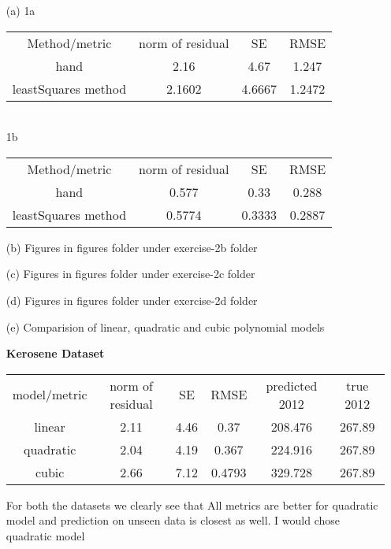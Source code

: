 \documentclass[unicode,11pt,a4paper,oneside,numbers=endperiod,openany]{scrartcl}
\begin{document}
\begin{itemize}
	\item [(a)] 
	{1a}
	\begin{center}
        \begin{tabular}{ c c c c}
         Method/metric & norm of residual & SE & RMSE\\ 
         hand & 2.16 & 4.67 & 1.247\\ 
         leastSquares method & 2.1602 & 4.6667 & 1.2472\\  
        \end{tabular}
    \end{center}
    \\
    {1b}
	\begin{center}
        \begin{tabular}{ c c c c}
         Method/metric & norm of residual & SE & RMSE\\ 
         hand & 0.577 & 0.33 & 0.288\\ 
         leastSquares method & 0.5774 & 0.3333 & 0.2887\\  
        \end{tabular}
    \end{center}
	\item [(b)] Figures in figures folder under exercise-2b folder
	\item [(c)] Figures in figures folder under exercise-2c folder
	\item [(d)] Figures in figures folder under exercise-2d folder
	\item [(e)] Comparision of linear, quadratic and cubic polynomial models
	
	\begin{center}
    {\bf{Kerosene Dataset}}
    \end{center}
	\begin{center}
	    
        \begin{tabular}{ c c c c c c}
         model/metric & norm of residual & SE & RMSE & predicted 2012 & true 2012\\ 
         linear & 2.11 & 4.46 & 0.37 & 208.476 & 267.89\\ 
         quadratic & 2.04 & 4.19 & 0.367 & 224.916  & 267.89\\  
         cubic & 2.66 & 7.12  & 0.4793 & 329.728 & 267.89
        \end{tabular}
    \end{center}
    
    {For both the datasets we clearly see that All metrics are better for quadratic model and prediction on unseen data is closest as well. I would chose quadratic model}
    

\end{itemize}
\end{document}
